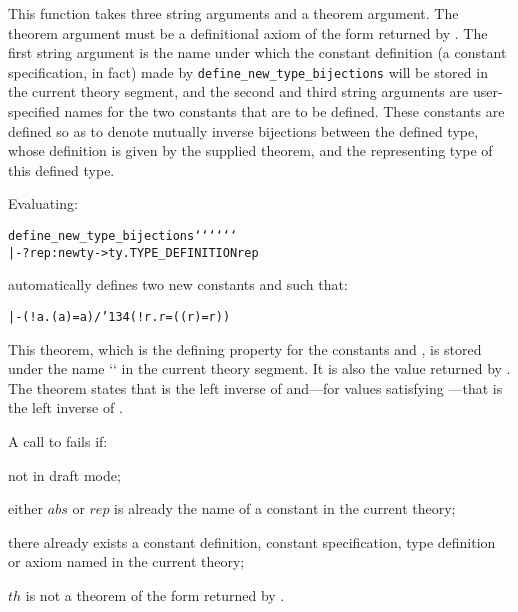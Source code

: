 {\noindent This function takes three string arguments and a theorem argument.
The theorem argument must be a definitional axiom of the form returned by
.  The first string argument is the name under which
the constant definition (a constant specification, in fact) made by
{\small\verb!define_new_type_bijections!} will be stored in the current theory
segment, and the second and third string arguments are user-specified names for
the two constants that are to be defined. These constants are defined so as to
denote mutually inverse bijections between the defined type, whose definition
is given by the supplied theorem, and the representing type of this defined
type.

Evaluating:

\medskip
{\def\op{{\normalsize\sl op}}
\begin{hol}\begin{alltt}
   define\_new\_type\_bijections `` `` `` 
           |- ?rep:newty->ty. TYPE\_DEFINITION  rep
\end{alltt}\end{hol}}

\medskip

\noindent automatically defines two new constants
 and  
such that:

{\def\bk{\char'134}
\begin{hol}\begin{alltt}
   |- (!a. ( a) = a) /\bk (!r.  r = (( r) = r))
\end{alltt}\end{hol}}

\noindent This theorem, which is the defining property for the constants
 and , is stored under the name `` in the current theory
segment.  It is also the value returned by .
The theorem states that  is the left inverse of  and---for
values satisfying ---that  is the left inverse of .

A call to 
fails if:

\begin{myenumerate}
\item not in draft mode;
\item either $abs$ or $rep$ is already the name of a constant in
the current theory;
\item there already exists a constant definition, constant specification,
type definition or axiom named   in the current theory; 
\item $th$ is not a theorem of the form returned by
.
\end{myenumerate}%

}
